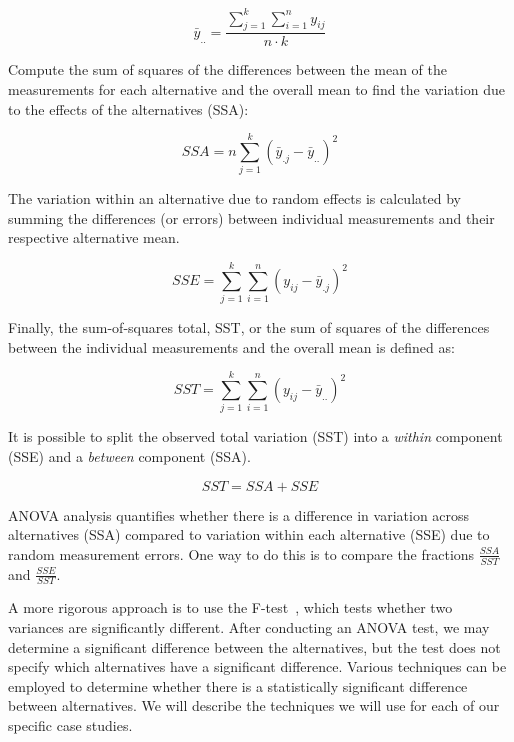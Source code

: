 \begin{equation}
  \bar{y}_{..} = \frac{\sum^k_{j = 1}\sum^n_{i = 1}y_{ij}}{n\cdot{}k}
\end{equation}

Compute the sum of squares of the differences between the mean of the measurements for each alternative and the overall mean to find the variation due to the effects of the alternatives (SSA):

\begin{equation}
    SSA = n \sum_{j = 1}^{k} (\bar{y}_{.j} - \bar{y}_{..})^2
\end{equation}

The variation within an alternative due to random effects is calculated by summing the differences (or errors) between individual measurements and their respective alternative mean.

\begin{equation}
    SSE = \sum_{j = 1}^{k}\sum_{i = 1}^{n} (y_{ij} - \bar{y}_{.j})^2
\end{equation}

Finally, the sum-of-squares total, SST, or the sum of squares of the differences between the individual measurements and the overall mean is defined as:

\begin{equation}
    SST = \sum_{j = 1}^{k}\sum_{i = 1}^{n} (y_{ij} - \bar{y}_{..})^2
\end{equation}

It is possible to split the observed total variation (SST) into a \emph{within} component (SSE) and a \emph{between} component (SSA).

\begin{equation}
    SST = SSA + SSE
\end{equation}

ANOVA analysis quantifies whether there is a difference in variation across alternatives (SSA) compared to variation within each alternative (SSE) due to random measurement errors. One way to do this is to compare the fractions \(\frac{SSA}{SST}\) and \(\frac{SSE}{SST}\).


A more rigorous approach is to use the F-test~\cite{lilja2005measuring}, which tests whether two variances are significantly different.  After conducting an ANOVA test, we may determine a significant difference between the alternatives, but the test does not specify which alternatives have a significant difference. Various techniques can be employed to determine whether there is a statistically significant difference between alternatives. We will describe the techniques we will use for each of our specific case studies.

